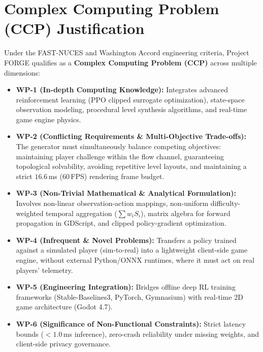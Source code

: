 \section{Complex Computing Problem (CCP) Justification}
Under the FAST-NUCES and Washington Accord engineering criteria, Project FORGE qualifies as a \textbf{Complex Computing Problem (CCP)} across multiple dimensions:
\begin{itemize}
    \item \textbf{WP-1 (In-depth Computing Knowledge):} Integrates advanced reinforcement learning (PPO clipped surrogate optimization), state-space observation modeling, procedural level synthesis algorithms, and real-time game engine physics.
    \item \textbf{WP-2 (Conflicting Requirements \& Multi-Objective Trade-offs):} The generator must simultaneously balance competing objectives: maintaining player challenge within the flow channel, guaranteeing topological solvability, avoiding repetitive level layouts, and maintaining a strict $16.6$\,ms (60\,FPS) rendering frame budget.
    \item \textbf{WP-3 (Non-Trivial Mathematical \& Analytical Formulation):} Involves non-linear observation-action mappings, non-uniform difficulty-weighted temporal aggregation ($\sum w_i S_i$), matrix algebra for forward propagation in GDScript, and clipped policy-gradient optimization.
    \item \textbf{WP-4 (Infrequent \& Novel Problems):} Transfers a policy trained against a simulated player (sim-to-real) into a lightweight client-side game engine, without external Python/ONNX runtimes, where it must act on real players' telemetry.
    \item \textbf{WP-5 (Engineering Integration):} Bridges offline deep RL training frameworks (Stable-Baselines3, PyTorch, Gymnasium) with real-time 2D game architecture (Godot 4.7).
    \item \textbf{WP-6 (Significance of Non-Functional Constraints):} Strict latency bounds ($<1.0$\,ms inference), zero-crash reliability under missing weights, and client-side privacy governance.
\end{itemize}

